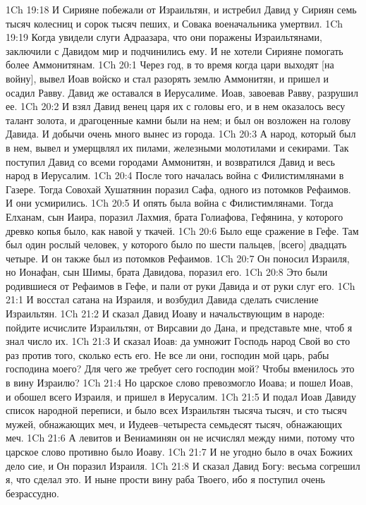 1Ch 19:18  И Сирияне побежали от Израильтян, и истребил Давид у Сириян семь тысяч колесниц и сорок тысяч пеших, и Совака военачальника умертвил.
1Ch 19:19  Когда увидели слуги Адраазара, что они поражены Израильтянами, заключили с Давидом мир и подчинились ему. И не хотели Сирияне помогать более Аммонитянам.
1Ch 20:1  Через год, в то время когда цари выходят [на войну], вывел Иоав войско и стал разорять землю Аммонитян, и пришел и осадил Равву. Давид же оставался в Иерусалиме. Иоав, завоевав Равву, разрушил ее.
1Ch 20:2  И взял Давид венец царя их с головы его, и в нем оказалось весу талант золота, и драгоценные камни были на нем; и был он возложен на голову Давида. И добычи очень много вынес из города.
1Ch 20:3  А народ, который был в нем, вывел и умерщвлял их пилами, железными молотилами и секирами. Так поступил Давид со всеми городами Аммонитян, и возвратился Давид и весь народ в Иерусалим.
1Ch 20:4  После того началась война с Филистимлянами в Газере. Тогда Совохай Хушатянин поразил Сафа, одного из потомков Рефаимов. И они усмирились.
1Ch 20:5  И опять была война с Филистимлянами. Тогда Елханам, сын Иаира, поразил Лахмия, брата Голиафова, Гефянина, у которого древко копья было, как навой у ткачей.
1Ch 20:6  Было еще сражение в Гефе. Там был один рослый человек, у которого было по шести пальцев, [всего] двадцать четыре. И он также был из потомков Рефаимов.
1Ch 20:7  Он поносил Израиля, но Ионафан, сын Шимы, брата Давидова, поразил его.
1Ch 20:8  Это были родившиеся от Рефаимов в Гефе, и пали от руки Давида и от руки слуг его.
1Ch 21:1  И восстал сатана на Израиля, и возбудил Давида сделать счисление Израильтян.
1Ch 21:2  И сказал Давид Иоаву и начальствующим в народе: пойдите исчислите Израильтян, от Вирсавии до Дана, и представьте мне, чтоб я знал число их.
1Ch 21:3  И сказал Иоав: да умножит Господь народ Свой во сто раз против того, сколько есть его. Не все ли они, господин мой царь, рабы господина моего? Для чего же требует сего господин мой? Чтобы вменилось это в вину Израилю?
1Ch 21:4  Но царское слово превозмогло Иоава; и пошел Иоав, и обошел всего Израиля, и пришел в Иерусалим.
1Ch 21:5  И подал Иоав Давиду список народной переписи, и было всех Израильтян тысяча тысяч, и сто тысяч мужей, обнажающих меч, и Иудеев--четыреста семьдесят тысяч, обнажающих меч.
1Ch 21:6  А левитов и Вениаминян он не исчислял между ними, потому что царское слово противно было Иоаву.
1Ch 21:7  И не угодно было в очах Божиих дело сие, и Он поразил Израиля.
1Ch 21:8  И сказал Давид Богу: весьма согрешил я, что сделал это. И ныне прости вину раба Твоего, ибо я поступил очень безрассудно.
